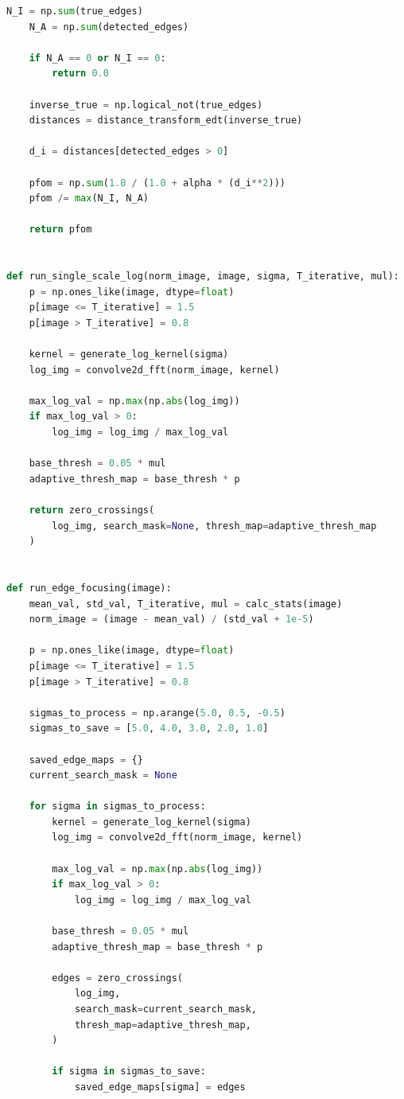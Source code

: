 \documentclass[11pt, letterpaper]{article}
\begin{document}
\begin{lstlisting}[language=Python]
    N_I = np.sum(true_edges)
    N_A = np.sum(detected_edges)

    if N_A == 0 or N_I == 0:
        return 0.0

    inverse_true = np.logical_not(true_edges)
    distances = distance_transform_edt(inverse_true)

    d_i = distances[detected_edges > 0]

    pfom = np.sum(1.0 / (1.0 + alpha * (d_i**2)))
    pfom /= max(N_I, N_A)

    return pfom


def run_single_scale_log(norm_image, image, sigma, T_iterative, mul):
    p = np.ones_like(image, dtype=float)
    p[image <= T_iterative] = 1.5
    p[image > T_iterative] = 0.8

    kernel = generate_log_kernel(sigma)
    log_img = convolve2d_fft(norm_image, kernel)

    max_log_val = np.max(np.abs(log_img))
    if max_log_val > 0:
        log_img = log_img / max_log_val

    base_thresh = 0.05 * mul
    adaptive_thresh_map = base_thresh * p

    return zero_crossings(
        log_img, search_mask=None, thresh_map=adaptive_thresh_map
    )


def run_edge_focusing(image):
    mean_val, std_val, T_iterative, mul = calc_stats(image)
    norm_image = (image - mean_val) / (std_val + 1e-5)

    p = np.ones_like(image, dtype=float)
    p[image <= T_iterative] = 1.5
    p[image > T_iterative] = 0.8

    sigmas_to_process = np.arange(5.0, 0.5, -0.5)
    sigmas_to_save = [5.0, 4.0, 3.0, 2.0, 1.0]

    saved_edge_maps = {}
    current_search_mask = None

    for sigma in sigmas_to_process:
        kernel = generate_log_kernel(sigma)
        log_img = convolve2d_fft(norm_image, kernel)

        max_log_val = np.max(np.abs(log_img))
        if max_log_val > 0:
            log_img = log_img / max_log_val

        base_thresh = 0.05 * mul
        adaptive_thresh_map = base_thresh * p

        edges = zero_crossings(
            log_img,
            search_mask=current_search_mask,
            thresh_map=adaptive_thresh_map,
        )

        if sigma in sigmas_to_save:
            saved_edge_maps[sigma] = edges


\end{lstlisting}
\end{document}

